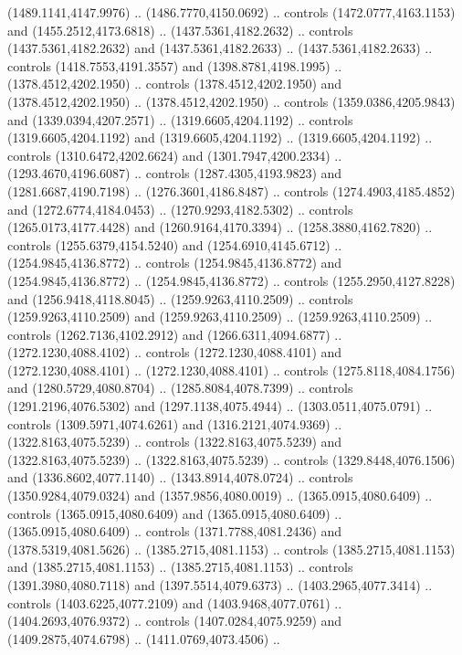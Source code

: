 \begin{scope}[shift={(-343.28256,-575.56596)}]
\begin{scope}[shift={(-736.04956,-3272.8657)}]
      (1489.1141,4147.9976) .. (1486.7770,4150.0692) .. controls
      (1472.0777,4163.1153) and (1455.2512,4173.6818) .. (1437.5361,4182.2632) ..
      controls (1437.5361,4182.2632) and (1437.5361,4182.2633) ..
      (1437.5361,4182.2633) .. controls (1418.7553,4191.3557) and
      (1398.8781,4198.1995) .. (1378.4512,4202.1950) .. controls
      (1378.4512,4202.1950) and (1378.4512,4202.1950) .. (1378.4512,4202.1950) ..
      controls (1359.0386,4205.9843) and (1339.0394,4207.2571) ..
      (1319.6605,4204.1192) .. controls (1319.6605,4204.1192) and
      (1319.6605,4204.1192) .. (1319.6605,4204.1192) .. controls
      (1310.6472,4202.6624) and (1301.7947,4200.2334) .. (1293.4670,4196.6087) ..
      controls (1287.4305,4193.9823) and (1281.6687,4190.7198) ..
      (1276.3601,4186.8487) .. controls (1274.4903,4185.4852) and
      (1272.6774,4184.0453) .. (1270.9293,4182.5302) .. controls
      (1265.0173,4177.4428) and (1260.9164,4170.3394) .. (1258.3880,4162.7820) ..
      controls (1255.6379,4154.5240) and (1254.6910,4145.6712) ..
      (1254.9845,4136.8772) .. controls (1254.9845,4136.8772) and
      (1254.9845,4136.8772) .. (1254.9845,4136.8772) .. controls
      (1255.2950,4127.8228) and (1256.9418,4118.8045) .. (1259.9263,4110.2509) ..
      controls (1259.9263,4110.2509) and (1259.9263,4110.2509) ..
      (1259.9263,4110.2509) .. controls (1262.7136,4102.2912) and
      (1266.6311,4094.6877) .. (1272.1230,4088.4102) .. controls
      (1272.1230,4088.4101) and (1272.1230,4088.4101) .. (1272.1230,4088.4101) ..
      controls (1275.8118,4084.1756) and (1280.5729,4080.8704) ..
      (1285.8084,4078.7399) .. controls (1291.2196,4076.5302) and
      (1297.1138,4075.4944) .. (1303.0511,4075.0791) .. controls
      (1309.5971,4074.6261) and (1316.2121,4074.9369) .. (1322.8163,4075.5239) ..
      controls (1322.8163,4075.5239) and (1322.8163,4075.5239) ..
      (1322.8163,4075.5239) .. controls (1329.8448,4076.1506) and
      (1336.8602,4077.1140) .. (1343.8914,4078.0724) .. controls
      (1350.9284,4079.0324) and (1357.9856,4080.0019) .. (1365.0915,4080.6409) ..
      controls (1365.0915,4080.6409) and (1365.0915,4080.6409) ..
      (1365.0915,4080.6409) .. controls (1371.7788,4081.2436) and
      (1378.5319,4081.5626) .. (1385.2715,4081.1153) .. controls
      (1385.2715,4081.1153) and (1385.2715,4081.1153) .. (1385.2715,4081.1153) ..
      controls (1391.3980,4080.7118) and (1397.5514,4079.6373) ..
      (1403.2965,4077.3414) .. controls (1403.6225,4077.2109) and
      (1403.9468,4077.0761) .. (1404.2693,4076.9372) .. controls
      (1407.0284,4075.9259) and (1409.2875,4074.6798) .. (1411.0769,4073.4506) ..

\end{scope}
\end{scope}
